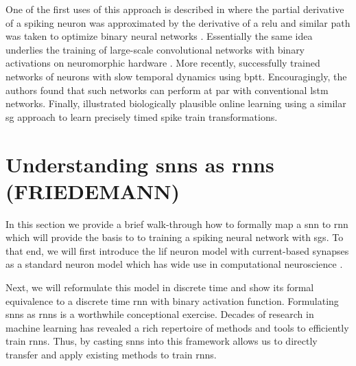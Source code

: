 \documentclass[journal,onecolumn,11pt]{IEEEtran}
\begin{document}
One of the first uses of this approach is described in
\citet{bohte_error-backpropagation_2011} where the partial derivative of a
spiking neuron was approximated by the derivative of a \gls{relu}
and similar path was taken to optimize binary neural networks
\citep{courbariaux_binarized_2016}.
Essentially the same idea underlies the training of large-scale
convolutional networks with binary activations on neuromorphic hardware
\cite{esser_convolutional_2016}.
More recently, \cite{bellec_long_2018} successfully trained networks of 
neurons with slow temporal dynamics using \gls{bptt}. Encouragingly, the 
authors found that such networks can perform at par with conventional 
\gls{lstm} networks.
Finally, \cite{zenke_superspike:_2018} illustrated biologically plausible online
learning using a similar \gls{sg} approach to learn precisely timed spike train
transformations. 

\cite{OConnor_Welling16_deepspik} %









\section{Understanding \glspl{snn} as \glspl{rnn} (FRIEDEMANN)}
\label{sec:understanding_ssn_as_rnn}

In this section we provide a brief walk-through how to formally map a \gls{snn} to \gls{rnn} 
which will provide the basis to to training a spiking neural network with \glspl{sg}.
To that end, we will first introduce the \gls{lif} neuron model
with current-based synapses as 
a standard neuron model which has wide use in computational neuroscience \cite{Gerstner_etal14_neurdyna}.

Next, we will reformulate this model in discrete time and show its formal equivalence to a discrete time \gls{rnn} with binary activation function. 
Formulating \glspl{snn} as \glspl{rnn} is a worthwhile conceptional exercise. 
Decades of research in machine learning has revealed a rich repertoire of
methods and tools to efficiently train \glspl{rnn}.
Thus, by casting \glspl{snn} into this framework allows us to directly
transfer and apply existing methods to train \glspl{rnn}. 
\end{document}

